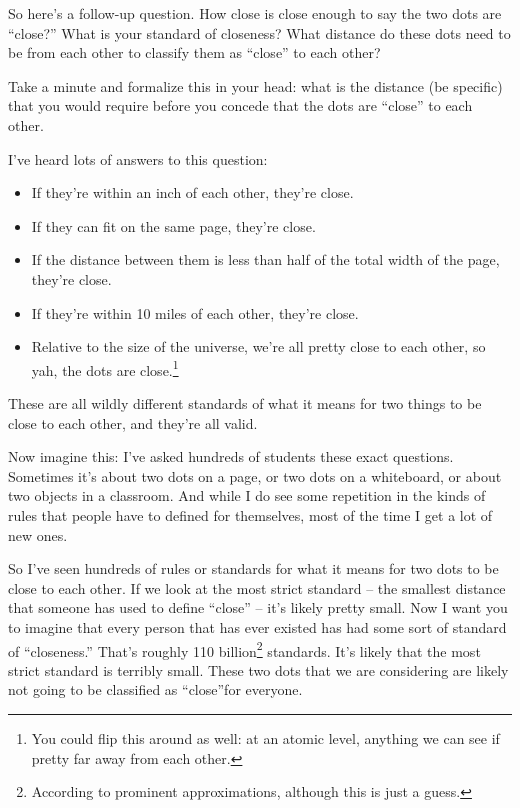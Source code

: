 So here's a follow-up question. How close is close enough to say the two dots are ``close?'' What is your standard of closeness? What distance do these dots need to be from each other to classify them as ``close'' to each other?

Take a minute and formalize this in your head: what is the distance (be specific) that you would require before you concede that the dots are ``close'' to each other.

I've heard lots of answers to this question:
\begin{itemize}
  \item If they're within an inch of each other, they're close.
  \item If they can fit on the same page, they're close.
  \item If the distance between them is less than half of the total width of the page, they're close.
  \item If they're within 10 miles of each other, they're close.
  \item Relative to the size of the universe, we're all pretty close to each other, so yah, the dots are close.\footnote{
    You could flip this around as well: at an atomic level, anything we can see if pretty far away from each other.
  }
\end{itemize}

These are all wildly different standards of what it means for two things to be close to each other, and they're all valid.

Now imagine this: I've asked hundreds of students these exact questions. Sometimes it's about two dots on a page, or two dots on a whiteboard, or about two objects in a classroom. And while I do see some repetition in the kinds of rules that people have to defined for themselves, most of the time I get a lot of new ones.

So I've seen hundreds of rules or standards for what it means for two dots to be close to each other. If we look at the most strict standard -- the smallest distance that someone has used to define ``close'' -- it's likely pretty small. Now I want you to imagine that every person that has ever existed has had some sort of standard of ``closeness.'' That's roughly 110 billion\footnote{
  According to prominent approximations, although this is just a guess.
}
standards. It's likely that the most strict standard is terribly small. These two dots that we are considering are likely not going to be classified as ``close''for everyone.

